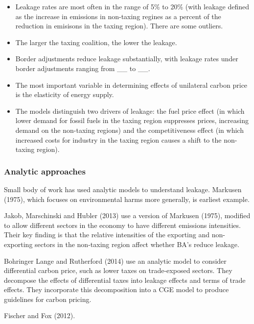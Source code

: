 \documentclass[notitlepage,12pt]{article}
\begin{document}
\begin{itemize}
\item Leakage rates are most often in the range of 5\% to 20\% (with leakage
defined as the increase in emissions in non-taxing regines as a percent of
the reduction in emisisons in the taxing region). There are some outliers.

\item The larger the taxing coalition, the lower the leakage.

\item Border adjustments reduce leakage substantially, with leakage rates
under border adjustments ranging from \_\_ to \_\_.

\item The most important variable in determining effects of unilateral
carbon price is the elasticity of energy supply.

\item The models distinguish two drivers of leakage: the fuel price effect
(in which lower demand for fossil fuels in the taxing region suppresses
prices, increasing demand on the non-taxing regions) and the competitiveness
effect (in which increased costs for industry in the taxing region causes a
shift to the non-taxing region).
\end{itemize}

\subsubsection{Analytic approaches}

Small body of work has used analytic models to understand leakage. Markusen
(1975), which focuses on environmental harms more generally, is earliest
example.

Jakob, Marschinski and Hubler (2013) use a version of Markusen (1975),
modified to allow different sectors in the economy to have different
emissions intensities. Their key finding is that the relative intensities of
the exporting and non-exporting sectors in the non-taxing region affect
whether BA's reduce leakage.

Bohringer Lange and Rutherford (2014) use an analytic model to consider
differential carbon price, such as lower taxes on trade-exposed sectors.
They decompose the effects of differential taxes into leakage effects and
terms of trade effects. They incorporate this decomposition into a CGE model
to produce guidelines for carbon pricing.

Fischer and Fox (2012).
\end{document}
